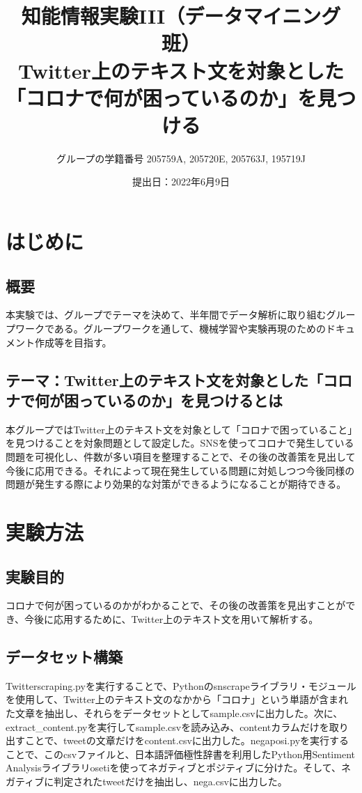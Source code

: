 \documentclass[a4paper, 11pt, titlepage]{jsarticle}
\title{知能情報実験III（データマイニング班）\\Twitter上のテキスト文を対象とした「コロナで何が困っているのか」を見つける}
\author{グループの学籍番号 205759A, 205720E, 205763J, 195719J}
\date{提出日：2022年6月9日}
\begin{document}
\maketitle
\tableofcontents
\clearpage

\section{はじめに}
\subsection{概要}
本実験では、グループでテーマを決めて、半年間でデータ解析に取り組むグループワークである。グループワークを通して、機械学習や実験再現のためのドキュメント作成等を目指す。

\subsection{テーマ：Twitter上のテキスト文を対象とした「コロナで何が困っているのか」を見つけるとは}
本グループではTwitter上のテキスト文を対象として「コロナで困っていること」を見つけることを対象問題として設定した。SNSを使ってコロナで発生している問題を可視化し、件数が多い項目を整理することで、その後の改善策を見出して今後に応用できる。それによって現在発生している問題に対処しつつ今後同様の問題が発生する際により効果的な対策ができるようになることが期待できる。

\section{実験方法}
\subsection{実験目的}
コロナで何が困っているのかがわかることで、その後の改善策を見出すことができ、今後に応用するために、Twitter上のテキスト文を用いて解析する。



\subsection{データセット構築}
Twitterscraping.pyを実行することで、Pythonのsnscrapeライブラリ・モジュールを使用して、Twitter上のテキスト文のなかから「コロナ」という単語が含まれた文章を抽出し、それらをデータセットとしてsample.csvに出力した\cite{snscrape}。次に、extract\_content.pyを実行してsample.csvを読み込み、contentカラムだけを取り出すことで、tweetの文章だけをcontent.csvに出力した。negaposi.pyを実行することで、このcsvファイルと、日本語評価極性辞書を利用したPython用Sentiment Analysisライブラリosetiを使ってネガティブとポジティブに分けた\cite{oseti}。そして、ネガティブに判定されたtweetだけを抽出し、nega.csvに出力した。
\end{document}
